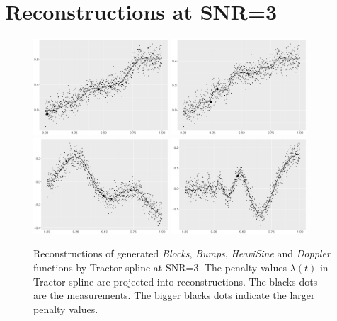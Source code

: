 

\section{Reconstructions at SNR=3}
\begin{figure}[!ht]
    \centering
    \includegraphics[width=0.45\textwidth]{Appendices/ggplot/ggBlocksPenaltyLineSNR3.pdf}
    \includegraphics[width=0.45\textwidth]{Appendices/ggplot/ggBumpsPenaltyLineSNR3.pdf}
    \includegraphics[width=0.45\textwidth]{Appendices/ggplot/ggHeaviPenaltyLineSNR3.pdf}
    \includegraphics[width=0.45\textwidth]{Appendices/ggplot/ggDopplerPenaltyLineSNR3.pdf}
\caption{Reconstructions of generated \textit{Blocks}, \textit{Bumps}, \textit{HeaviSine} and \textit{Doppler} functions by Tractor spline at SNR=3. The penalty values $\lambda(t)$ in Tractor spline are projected into reconstructions. The blacks dots are the measurements. The bigger blacks dots indicate the larger penalty values.}\label{TractorsplineSNR3}
\end{figure}


